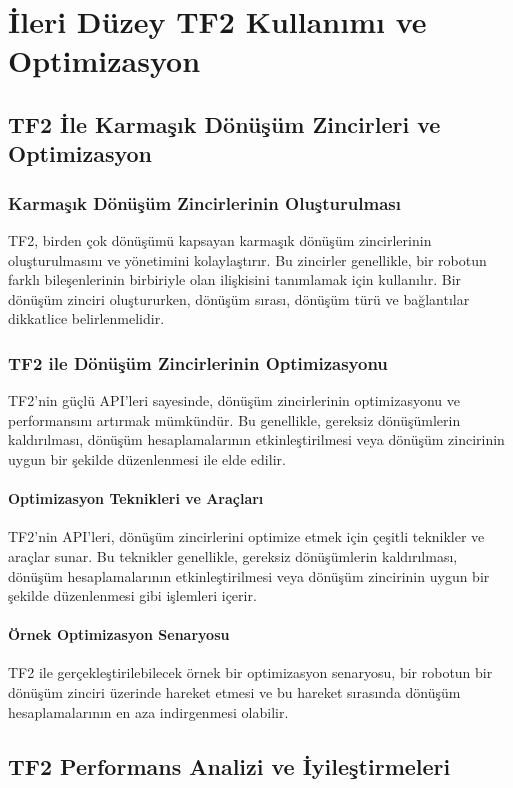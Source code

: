 \chapter{İleri Düzey TF2 Kullanımı ve Optimizasyon}

\section{TF2 İle Karmaşık Dönüşüm Zincirleri ve Optimizasyon}
\subsection{Karmaşık Dönüşüm Zincirlerinin Oluşturulması}
TF2, birden çok dönüşümü kapsayan karmaşık dönüşüm zincirlerinin oluşturulmasını ve yönetimini kolaylaştırır. Bu zincirler genellikle, bir robotun farklı bileşenlerinin birbiriyle olan ilişkisini tanımlamak için kullanılır. Bir dönüşüm zinciri oluştururken, dönüşüm sırası, dönüşüm türü ve bağlantılar dikkatlice belirlenmelidir.

\subsection{TF2 ile Dönüşüm Zincirlerinin Optimizasyonu}
TF2'nin güçlü API'leri sayesinde, dönüşüm zincirlerinin optimizasyonu ve performansını artırmak mümkündür. Bu genellikle, gereksiz dönüşümlerin kaldırılması, dönüşüm hesaplamalarının etkinleştirilmesi veya dönüşüm zincirinin uygun bir şekilde düzenlenmesi ile elde edilir.

\subsubsection{Optimizasyon Teknikleri ve Araçları}
TF2'nin API'leri, dönüşüm zincirlerini optimize etmek için çeşitli teknikler ve araçlar sunar. Bu teknikler genellikle, gereksiz dönüşümlerin kaldırılması, dönüşüm hesaplamalarının etkinleştirilmesi veya dönüşüm zincirinin uygun bir şekilde düzenlenmesi gibi işlemleri içerir.

\subsubsection{Örnek Optimizasyon Senaryosu}
TF2 ile gerçekleştirilebilecek örnek bir optimizasyon senaryosu, bir robotun bir dönüşüm zinciri üzerinde hareket etmesi ve bu hareket sırasında dönüşüm hesaplamalarının en aza indirgenmesi olabilir.

\section{TF2 Performans Analizi ve İyileştirmeleri}
